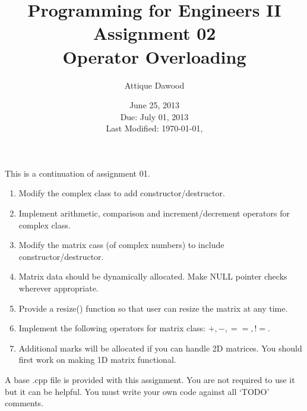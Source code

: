\documentclass[12pt,a4paper]{article}
\title{\vspace{-2cm}Programming for Engineers II\\Assignment 02\\Operator Overloading}
\author{Attique Dawood}
\date{June 25, 2013\\Due: July 01, 2013\\[0.2cm] Last Modified: \today, \currenttime}
\begin{document}
\maketitle
\noindent This is a continuation of assignment 01.
\begin{enumerate}
\item Modify the complex class to add constructor/destructor.
\item Implement arithmetic, comparison and increment/decrement operators for complex class.
\item Modify the matrix cass (of complex numbers) to include constructor/destructor.
\item Matrix data should be dynamically allocated. Make NULL pointer checks wherever appropriate.
\item Provide a resize() function so that user can resize the matrix at any time.
\item Implement the following operators for matrix class: $+, -, ==, !=$.
\item Additional marks will be allocated if you can handle 2D matrices. You should first work on making 1D matrix functional.
\end{enumerate}
A base .cpp file is provided with this assignment. You are not required to use it but it can be helpful. You must write your own code against all `TODO' comments.
\end{document}
